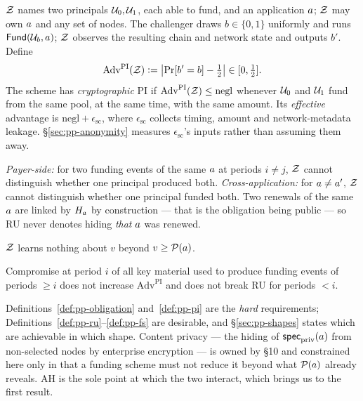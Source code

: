 \begin{definition}
\label{def:pp-pi}
$\mathcal{Z}$ names two principals $\mathcal{U}_0,\mathcal{U}_1$, each able to fund, and an application $a$;
$\mathcal{Z}$ may own $a$ and any set of nodes. The challenger draws $b \in \{0,1\}$ uniformly and runs
$\mathsf{Fund}(\mathcal{U}_b,a)$; $\mathcal{Z}$ observes the resulting chain and network state and outputs
$b'$. Define
\[
  \mathrm{Adv}^{\mathrm{PI}}(\mathcal{Z}) \vcentcolon= \left|\Pr[b'=b] - \tfrac12\right| \in [0,\tfrac12].
\]
The scheme has \emph{cryptographic} PI if $\mathrm{Adv}^{\mathrm{PI}}(\mathcal{Z}) \le \mathrm{negl}$ whenever
$\mathcal{U}_0$ and $\mathcal{U}_1$ fund from the same pool, at the same time, with the same amount. Its
\emph{effective} advantage is $\mathrm{negl} + \epsilon_{\mathrm{sc}}$, where $\epsilon_{\mathrm{sc}}$
collects timing, amount and network-metadata leakage. \S\ref{sec:pp-anonymity} measures
$\epsilon_{\mathrm{sc}}$'s inputs rather than assuming them away.
\end{definition}

\begin{definition}
\label{def:pp-ru}
\emph{Payer-side:} for two funding events of the same $a$ at periods $i \ne j$, $\mathcal{Z}$ cannot
distinguish whether one principal produced both. \emph{Cross-application:} for $a \ne a'$,
$\mathcal{Z}$ cannot distinguish whether one principal funded both. Two renewals of the same $a$ are
linked by $H_{a}$ by construction --- that is the obligation being public --- so RU never denotes
hiding \emph{that} $a$ was renewed.
\end{definition}

\begin{definition}
\label{def:pp-ah}
$\mathcal{Z}$ learns nothing about $v$ beyond $v \ge \mathcal{P}(a)$.
\end{definition}

\begin{definition}
\label{def:pp-fs}
Compromise at period $i$ of all key material used to produce funding events of periods $\ge i$ does
not increase $\mathrm{Adv}^{\mathrm{PI}}$ and does not break RU for periods $< i$.
\end{definition}

Definitions~\ref{def:pp-obligation} and~\ref{def:pp-pi} are the \emph{hard} requirements;
Definitions~\ref{def:pp-ru}--\ref{def:pp-fs} are desirable, and \S\ref{sec:pp-shapes} states which are
achievable in which shape. Content privacy --- the hiding of $\mathsf{spec}_{\mathrm{priv}}(a)$
from non-selected nodes by enterprise encryption --- is owned by \S10 and constrained here only in
that a funding scheme must not reduce it beyond what $\mathcal{P}(a)$ already reveals. AH is the sole
point at which the two interact, which brings us to the first result.

